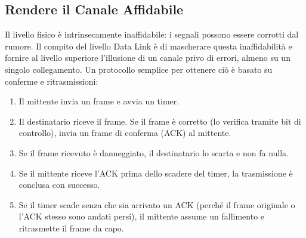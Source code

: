 \subsection{Rendere il Canale Affidabile}
Il livello fisico è intrinsecamente inaffidabile: i segnali possono essere corrotti dal rumore. Il compito del livello Data Link è di mascherare questa inaffidabilità e fornire al livello superiore l'illusione di un canale privo di errori, almeno su un singolo collegamento.
Un protocollo semplice per ottenere ciò è basato su conferme e ritrasmissioni:
\begin{enumerate}
    \item Il mittente invia un frame e avvia un timer.
    \item Il destinatario riceve il frame. Se il frame è corretto (lo verifica tramite bit di controllo), invia un frame di conferma (ACK) al mittente.
    \item Se il frame ricevuto è danneggiato, il destinatario lo scarta e non fa nulla.
    \item Se il mittente riceve l'ACK prima dello scadere del timer, la trasmissione è conclusa con successo.
    \item Se il timer scade senza che sia arrivato un ACK (perché il frame originale o l'ACK stesso sono andati persi), il mittente assume un fallimento e ritrasmette il frame da capo.
\end{enumerate}

